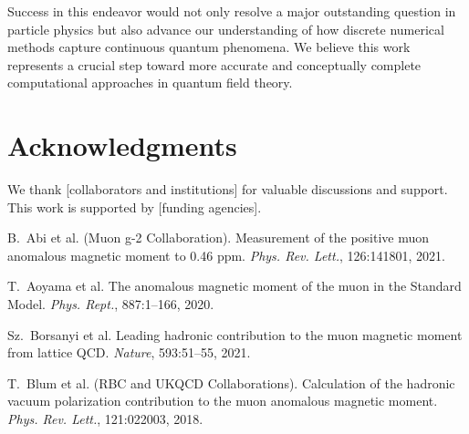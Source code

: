 ﻿\documentclass[12pt]{article}
\theoremstyle{definition}
\theoremstyle{plain}
\begin{document}
Success in this endeavor would not only resolve a major outstanding question in particle physics but also advance our understanding of how discrete numerical methods capture continuous quantum phenomena. We believe this work represents a crucial step toward more accurate and conceptually complete computational approaches in quantum field theory.


\section*{Acknowledgments}
We thank [collaborators and institutions] for valuable discussions and support. This work is supported by [funding agencies].





\begin{thebibliography}{10}


B.~Abi et al. (Muon g-2 Collaboration).
\newblock Measurement of the positive muon anomalous magnetic moment to 0.46 ppm.
\newblock \emph{Phys. Rev. Lett.}, 126:141801, 2021.


T.~Aoyama et al.
\newblock The anomalous magnetic moment of the muon in the Standard Model.
\newblock \emph{Phys. Rept.}, 887:1--166, 2020.


Sz.~Borsanyi et al.
\newblock Leading hadronic contribution to the muon magnetic moment from lattice QCD.
\newblock \emph{Nature}, 593:51--55, 2021.


T.~Blum et al. (RBC and UKQCD Collaborations).
\newblock Calculation of the hadronic vacuum polarization contribution to the muon anomalous magnetic moment.
\newblock \emph{Phys. Rev. Lett.}, 121:022003, 2018.


\end{thebibliography}
\end{document}
